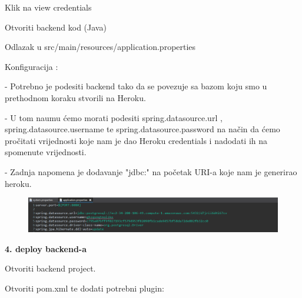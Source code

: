 \begin{packed_item}
\begin{packed_enum}
							\item Klik na view credentials
							
							\item Otvoriti backend kod (Java)
							
							\item Odlazak u src/main/resources/application.properties
							
							\item Konfiguracija :
							    
							       - Potrebno je podesiti backend tako da se povezuje sa bazom koju smo u prethodnom koraku stvorili na Heroku.
							       
							       - U tom naumu ćemo morati podesiti spring.datasource.url , spring.datasource.username te spring.datasource.password na način da ćemo pročitati vrijednosti koje nam je dao Heroku credentials i nadodati ih na spomenute vrijednosti.
							       
							       - Zadnja napomena je dodavanje "jdbc:" na početak URI-a koje nam je generirao heroku.
						
							    \begin{figure}[H]
                        			\hspace*{-1.5cm}
                        			\includegraphics[scale=0.5]{slike/java.PNG} %
                        			\centering
                        			\label{fig:promjene}
                        		\end{figure}

						\end{packed_enum}
						
						\item  \textbf{4. deploy backend-a}
						\item[] \begin{packed_enum}
	
							\item Otvoriti backend project.
							
							\item Otvoriti pom.xml te dodati potrebni plugin:
			

\end{packed_enum}
\end{packed_item}
